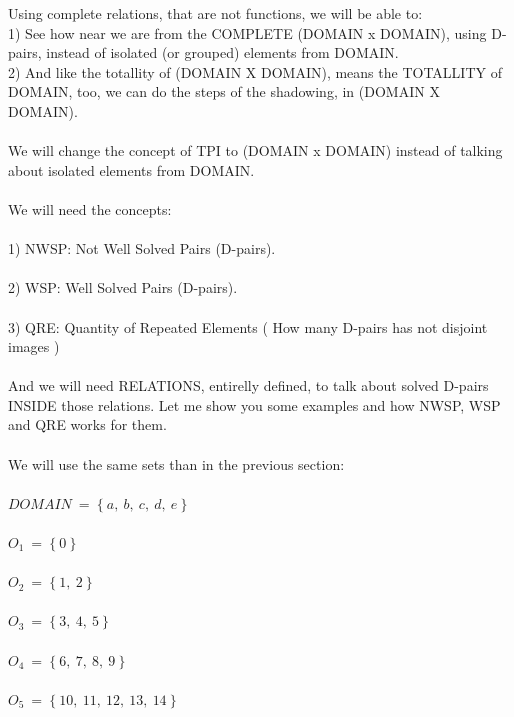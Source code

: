 		\noindent
		Using complete relations, that are not functions, we will be able to:\\
		1) See how near we are from the COMPLETE (DOMAIN x DOMAIN), using D-pairs, instead of isolated (or grouped) elements from DOMAIN.\\
		2) And like the totallity of (DOMAIN X DOMAIN), means the TOTALLITY of DOMAIN, too, we can do the steps of the shadowing, in (DOMAIN X DOMAIN).
		\\\\
		
		\noindent
		We will change the concept of TPI to (DOMAIN x DOMAIN) instead of talking about isolated elements from DOMAIN.
		\\\\
		
		\noindent
		We will need the concepts:\\\\
		1) NWSP: Not Well Solved Pairs (D-pairs).\\\\
		2) WSP: Well Solved Pairs (D-pairs).\\\\
		3) QRE: Quantity of Repeated Elements ( How many D-pairs has not disjoint images )
		\\\\
		
		\noindent
		And we will need RELATIONS, entirelly defined, to talk about solved D-pairs INSIDE those relations. Let me show you some examples and how NWSP, WSP and QRE works for them.
		\\\\
		
		\noindent
		We will use the same sets than in the previous section:\\\\
		$DOMAIN \: = \: \{ \: a, \: b, \: c, \: d, \: e \:\}$\\\\
		$O_{1} \: = \: \{ \: 0 \:\}$\\\\ 
		$O_{2} \: = \: \{ \: 1, \: 2 \: \}$\\\\ 
		$O_{3} \: = \: \{ \: 3, \: 4, \: 5 \: \}$\\\\ 
		$O_{4} \: = \: \{ \: 6, \: 7, \: 8, \: 9 \: \}$\\\\ 
		$O_{5} \: = \: \{ \: 10, \: 11, \: 12, \: 13, \: 14 \: \}$
		\\\\
		
